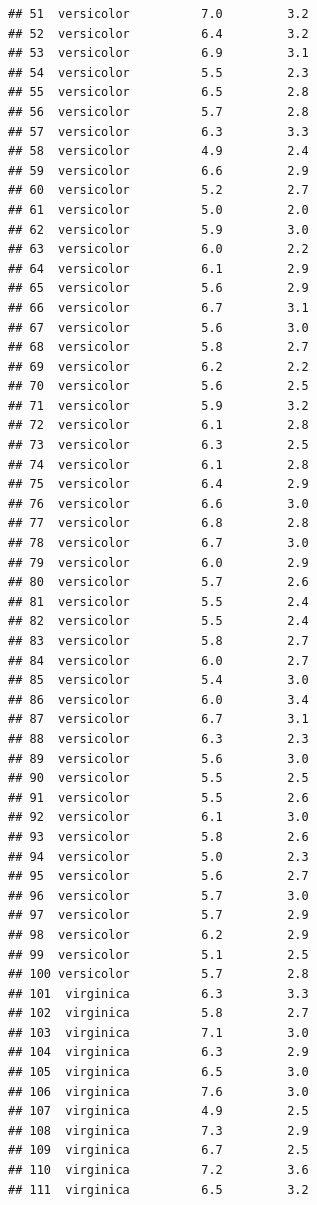 \documentclass[krantz2]{krantz}\usepackage{knitr}%
\begin{document}
\begin{knitrout}
\begin{kframe}
\begin{verbatim}
## 51  versicolor          7.0         3.2
## 52  versicolor          6.4         3.2
## 53  versicolor          6.9         3.1
## 54  versicolor          5.5         2.3
## 55  versicolor          6.5         2.8
## 56  versicolor          5.7         2.8
## 57  versicolor          6.3         3.3
## 58  versicolor          4.9         2.4
## 59  versicolor          6.6         2.9
## 60  versicolor          5.2         2.7
## 61  versicolor          5.0         2.0
## 62  versicolor          5.9         3.0
## 63  versicolor          6.0         2.2
## 64  versicolor          6.1         2.9
## 65  versicolor          5.6         2.9
## 66  versicolor          6.7         3.1
## 67  versicolor          5.6         3.0
## 68  versicolor          5.8         2.7
## 69  versicolor          6.2         2.2
## 70  versicolor          5.6         2.5
## 71  versicolor          5.9         3.2
## 72  versicolor          6.1         2.8
## 73  versicolor          6.3         2.5
## 74  versicolor          6.1         2.8
## 75  versicolor          6.4         2.9
## 76  versicolor          6.6         3.0
## 77  versicolor          6.8         2.8
## 78  versicolor          6.7         3.0
## 79  versicolor          6.0         2.9
## 80  versicolor          5.7         2.6
## 81  versicolor          5.5         2.4
## 82  versicolor          5.5         2.4
## 83  versicolor          5.8         2.7
## 84  versicolor          6.0         2.7
## 85  versicolor          5.4         3.0
## 86  versicolor          6.0         3.4
## 87  versicolor          6.7         3.1
## 88  versicolor          6.3         2.3
## 89  versicolor          5.6         3.0
## 90  versicolor          5.5         2.5
## 91  versicolor          5.5         2.6
## 92  versicolor          6.1         3.0
## 93  versicolor          5.8         2.6
## 94  versicolor          5.0         2.3
## 95  versicolor          5.6         2.7
## 96  versicolor          5.7         3.0
## 97  versicolor          5.7         2.9
## 98  versicolor          6.2         2.9
## 99  versicolor          5.1         2.5
## 100 versicolor          5.7         2.8
## 101  virginica          6.3         3.3
## 102  virginica          5.8         2.7
## 103  virginica          7.1         3.0
## 104  virginica          6.3         2.9
## 105  virginica          6.5         3.0
## 106  virginica          7.6         3.0
## 107  virginica          4.9         2.5
## 108  virginica          7.3         2.9
## 109  virginica          6.7         2.5
## 110  virginica          7.2         3.6
## 111  virginica          6.5         3.2

\end{verbatim}
\end{kframe}
\end{knitrout}
\end{document}
